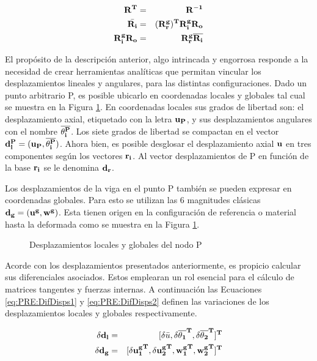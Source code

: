 	\begin{eqnarray}
		\label{eq:PRE:PropOrto}
		\bf{R}^T&=&\bf{R}^{-1}\\
		\label{eq:PRE:Vincul1}
		\bar{\bf{R_i}}&= &(\bf{R_r^g})^T\bf{R_i^g}\bf{R_o}\\
		\label{eq:PRE:Vincul2}
		\bf{R_i^g}\bf{R_o} &=& \bf{R_r^g}\overline{\bf{R_i}}
	\end{eqnarray}


El propósito de la descripción anterior, algo intrincada y engorrosa responde a la necesidad de crear herramientas analíticas que permitan vincular los
desplazamientos lineales y angulares, para las distintas configuraciones. Dado un punto arbitrario P, es posible ubicarlo en coordenadas locales y
globales tal cual se muestra en la Figura \ref{fig:PRE:IlusCorrotDisps}. En coordenadas locales sus grados de libertad son: el desplazamiento axial, etiquetado con la
letra $\bf{u_P}$, y sus desplazamientos angulares con el nombre $ \bf{\overline{\theta_i^P}}$. Los siete grados de libertad se compactan en el vector
$\bf{d}_l^P=(\bf{u_P},\bf{\overline{\theta_i^P}})$. Ahora bien, es posible desglosar el desplazamiento axial $\bf{u}$ en tres componentes según los vectores $\bf{r_i}$. Al vector desplazamientos de P en función de la base  $\bf{r_i}$ se le denomina $\bf{d_r}$.

Los desplazamientos de la viga en el punto P también se pueden expresar en
coordenadas globales.  Para esto se utilizan las 6 magnitudes clásicas 
$\bf{d_g} = (\bf{u^g},\bf{w^g})$. Esta tienen origen en la configuración
de referencia o material hasta la deformada como se muestra en la Figura
\ref{fig:PRE:IlusCorrotDisps}.

\begin{figure}[htbp]
	\centering
	\def\svgwidth{100mm}
	
	\caption{Desplazamientos locales y globales del nodo P}
	\label{fig:PRE:IlusCorrotDisps}
\end{figure}

Acorde con los desplazamientos presentados anteriormente, es propicio calcular sus diferenciales asociados. Estos emplearan un rol esencial para el cálculo de matrices tangentes y fuerzas internas. A continuación las Ecuaciones \eqref{eq:PRE:DifDisps1} y \eqref{eq:PRE:DifDisps2}
definen las variaciones de los desplazamientos locales y globales respectivamente. 

\begin{eqnarray}\label{eq:PRE:DifDisps1}
		\bf{\delta d_l} &=& [\delta\bar{u}, \bf{\delta\overline{ \theta _1}^T},	\bf{\delta \overline{ \theta _2}^T}]^T\\
	\label{eq:PRE:DifDisps2}
	\bf{\delta d_g} &=& [\bf{\delta u_1^g}^T, \bf{\delta u_2^g}^T, \bf{{w_1^g}^T}, \bf{{w_2^g}^T}]^T
\end{eqnarray}


